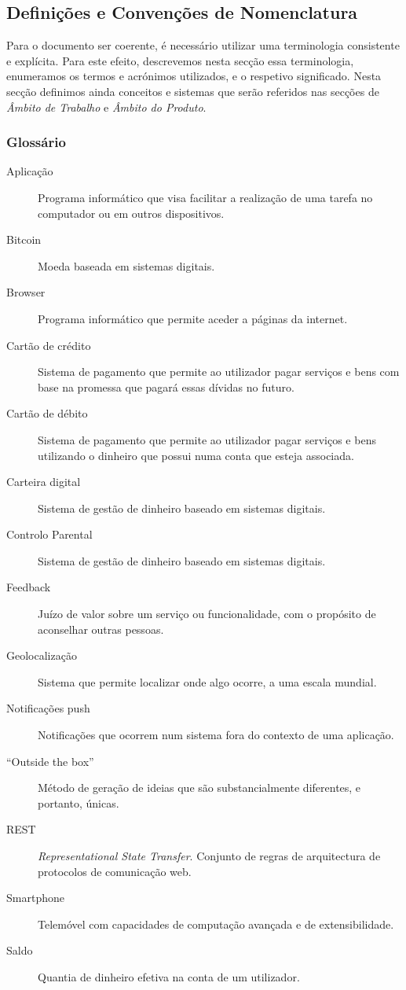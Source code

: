 \documentclass{article}
\begin{document}
  \subsection{Definições e Convenções de Nomenclatura}

    Para o documento ser coerente, é necessário utilizar uma terminologia consistente e explícita. Para este efeito, descrevemos nesta secção essa terminologia, enumeramos os termos e acrónimos utilizados, e o respetivo significado. Nesta secção definimos ainda conceitos e sistemas que serão referidos nas secções de \emph{Âmbito de Trabalho} e \emph{Âmbito do Produto}.

    \subsubsection{Glossário}

      \begin{description}
        \item[Aplicação]Programa informático que visa facilitar a realização de uma tarefa no computador ou em outros dispositivos.
        \item[Bitcoin]Moeda baseada em sistemas digitais.
        \item[Browser]Programa informático que permite aceder a páginas da internet.
        \item[Cartão de crédito]Sistema de pagamento que permite ao utilizador pagar serviços e bens com base na promessa que pagará essas dívidas no futuro.

        \item[Cartão de débito]Sistema de pagamento que permite ao utilizador pagar serviços e bens utilizando o dinheiro que possui numa conta que esteja associada.
        \item[Carteira digital]Sistema de gestão de dinheiro baseado em sistemas digitais.
        \item[Controlo Parental]Sistema de gestão de dinheiro baseado em sistemas digitais.
        \item[Feedback]Juízo de valor sobre um serviço ou funcionalidade, com o propósito de aconselhar outras pessoas.
        \item[Geolocalização]Sistema que permite localizar onde algo ocorre, a uma escala mundial.

        \item[Notificações push]Notificações que ocorrem num sistema fora do contexto de uma aplicação.
        \item[``Outside the box'']Método de geração de ideias que são substancialmente diferentes, e portanto, únicas.
        \item[REST]\emph{Representational State Transfer}. Conjunto de regras de arquitectura de protocolos de comunicação web.
        \item[Smartphone]Telemóvel com capacidades de computação avançada e de extensibilidade.
        \item[Saldo]Quantia de dinheiro efetiva na conta de um utilizador.
      \end{description}
\end{document}
